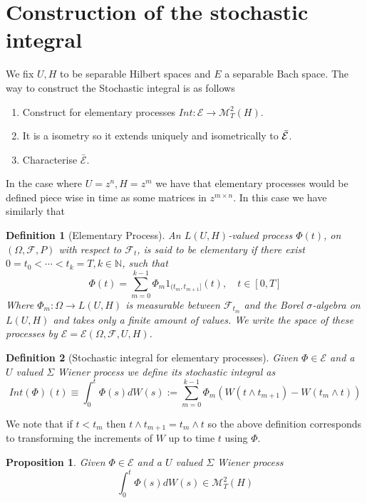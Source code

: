 \documentclass[12pt]{article}
\newcommand{\R}zzzzz
\newcommand{\om}{\Omega}
\newtheorem{proposition}{Proposition}
\newtheorem{definition}{Definition}
\begin{document}
\section{Construction of the stochastic integral}
We fix $U,H$ to be separable Hilbert spaces and $E$ a separable Bach space.
The way to construct the Stochastic integral is as follows
\begin{enumerate}
	\item Construct for elementary processes $Int:\mathcal{E}\to\mathcal{M}_T^2(H)$.
	\item It is a isometry so it extends uniquely and isometrically to $\Bar{\mathcal{E}}$.
	\item Characterise $\bar{\mathcal{E}}$.
\end{enumerate}
In the case where $U=\R^n,H=\R^m$ we have that elementary processes would be defined piece wise in time as some matrices in $\R^{m\times n}$. In this case we have similarly that
\begin{definition}
	[Elementary Process] An $L(U, H)$-valued process $\Phi(t)$, on $(\Omega, \mathcal{F}, P)$ with respect to $\mathcal{F}_{t}$, is said to be elementary if there exist $0=t_{0}<\cdots<t_{k}=T, k \in \mathbb{N}$, such that
	$$
		\Phi(t)=\sum_{m=0}^{k-1} \Phi_{m} 1_{( t_{m}, t_{m+1}]}(t), \quad t \in[0, T]
	$$
	Where $\Phi_m:\om\to L(U,H)$ is measurable between $\mathcal{F}_{t_m}$ and the Borel $\sigma$-algebra on $L(U,H)$ and takes only a finite amount of values. We write the space of these processes by $\mathcal{E}=\mathcal{E}(\om,\mathcal{F},U,H)$.
\end{definition}
\begin{definition}[Stochastic integral for elementary processes]
	Given $\Phi\in\mathcal{E}$ and a $U$ valued $\Sigma$ Wiener process we define its stochastic integral as
	\begin{equation*}
		Int(\Phi)(t)\equiv \int_0^t\Phi(s)dW(s):=\sum_{m=0}^{k-1} \Phi_{m}(W(t\wedge t_{m+1})-W(t_m\wedge t))
	\end{equation*}
\end{definition}
We note that if $t<t_m$ then $t\wedge t_{m+1}=t_m\wedge t$ so the above definition corresponds to transforming the increments of $W$ up to time $t$ using $\Phi$.
\begin{proposition}
	Given $\Phi\in\mathcal{E}$ and a $U$ valued $\Sigma$ Wiener process
	\begin{equation*}
		\int_0^t\Phi(s)dW(s)\in\mathcal{M}_T^2(H)
	\end{equation*}
\end{proposition}
\end{document}
